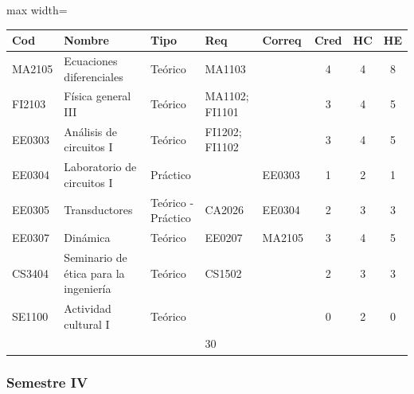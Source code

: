 \begin{center}
\small
\begin{adjustbox}{max width=\textwidth}
\begin{tabular}{|>{\RaggedRight\arraybackslash}p{1.25cm}|>{\RaggedRight\arraybackslash}p{5.2cm}|>{\RaggedRight\arraybackslash}p{1.65cm}|p{1.25cm}|p{1.25cm}|c|c|c|}
\hline
\rowcolor{grisEncabezado}
Cod & Nombre & Tipo & Req & Correq & Cred & HC & HE \\ \hline
MA2105 & Ecuaciones diferenciales & Teórico & MA1103 &  & 4 & 4 & 8 \\ \hline
\rowcolor{azulTabla}
FI2103 & Física general III & Teórico & MA1102; FI1101 &  & 3 & 4 & 5 \\ \hline
EE0303 & Análisis de circuitos I & Teórico & FI1202; FI1102 &  & 3 & 4 & 5 \\ \hline
\rowcolor{azulTabla}
EE0304 & Laboratorio de circuitos I & Práctico &  & EE0303 & 1 & 2 & 1 \\ \hline
EE0305 & Transductores & Teórico - Práctico & CA2026 & EE0304 & 2 & 3 & 3 \\ \hline
\rowcolor{azulTabla}
EE0307 & Dinámica & Teórico & EE0207 & MA2105 & 3 & 4 & 5 \\ \hline
CS3404 & Seminario de ética para la ingeniería & Teórico & CS1502 &  & 2 & 3 & 3 \\ \hline
\rowcolor{azulTabla}
SE1100 & Actividad cultural I & Teórico &  &  & 0 & 2 & 0 \\ \hline
\multicolumn{5}{|l|}{Total} & 18 & 26 & 30 \\ \hline
\end{tabular}
\end{adjustbox}
\end{center}

\subsubsection*{Semestre IV}

